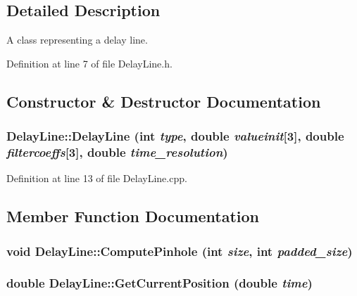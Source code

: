 \subsection{Detailed Description}
A class representing a delay line. 

Definition at line 7 of file DelayLine.h.



\subsection{Constructor \& Destructor Documentation}
\hypertarget{classDelayLine_aae3ff3e21f8887d0df1948e13c093b90}{
\subsubsection[{DelayLine}]{\setlength{\rightskip}{0pt plus 5cm}DelayLine::DelayLine (int {\em type}, \/  double {\em valueinit}\mbox{[}3\mbox{]}, \/  double {\em filtercoeffs}\mbox{[}3\mbox{]}, \/  double {\em time\_\-resolution})}}
\label{classDelayLine_aae3ff3e21f8887d0df1948e13c093b90}


Definition at line 13 of file DelayLine.cpp.



\subsection{Member Function Documentation}
\hypertarget{classDelayLine_aa11d93779cebcc3a57b920a5fcbda891}{
\subsubsection[{ComputePinhole}]{\setlength{\rightskip}{0pt plus 5cm}void DelayLine::ComputePinhole (int {\em size}, \/  int {\em padded\_\-size})}}
\label{classDelayLine_aa11d93779cebcc3a57b920a5fcbda891}
\hypertarget{classDelayLine_a230dfa049c8b66e41e028c15b63d23fa}{
\subsubsection[{GetCurrentPosition}]{\setlength{\rightskip}{0pt plus 5cm}double DelayLine::GetCurrentPosition (double {\em time})}}
\label{classDelayLine_a230dfa049c8b66e41e028c15b63d23fa}


